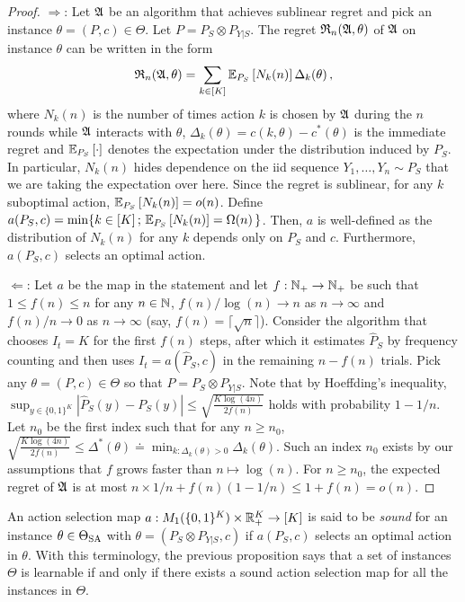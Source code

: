 \begin{proof}
$\Rightarrow$: Let $\mathfrak{A}$ be an algorithm that achieves sublinear regret
and pick  an instance  $\theta = (P,c)\in\Theta$. Let $P = P_S \otimes P_{Y|S}$.
The regret $\mathfrak{R}_n(\mathfrak{A},\theta)$ of $\mathfrak{A}$ on instance $\theta$ can be written in the form
\begin{align*}
\mathfrak{R}_n(\mathfrak{A},\theta) = \sum_{k\in [K]} \mathbb{E}_{P_S}\left[N_k(n)\right] \Delta_k(\theta)\,,
\end{align*}
where $N_k(n)$ is the number of times action $k$ is chosen by $\mathfrak{A}$ during the $n$ rounds while
$\mathfrak{A}$ interacts with $\theta$, $\Delta_k(\theta) = c(k,\theta) - c^*(\theta)$ is the immediate regret
and $\mathbb{E}_{P_S}\left[\cdot\right]$ denotes the expectation under the distribution induced by $P_S$.
In particular, $N_k(n)$ hides dependence on the iid sequence $Y_1,\dots,Y_n \sim P_S$ 
that we are taking the expectation over here. 
Since the regret is sublinear, for any $k$ suboptimal action, $\mathbb{E}_{P_S}\left[N_k(n)\right] = o(n)$. 
Define $a(P_S,c) = \min \{ k\in [K]\,;\, \mathbb{E}_{P_S}\left[N_k(n)\right] = \Omega(n) \,\}$. Then, $a$ is well-defined as the distribution of $N_k(n)$ for any $k$ depends only on $P_S$ and $c$. Furthermore, $a(P_S,c)$ selects an optimal action.

$\Leftarrow$: Let $a$ be the map in the statement and let $f:\mathbb{N}_+\to\mathbb{N}_+$ be such that $1\le f(n)\le n$ for any  $n\in \mathbb{N}$,
$f(n)/\log(n) \to n$ as $n\to \infty$ and $f(n)/n \to 0$ as $n\to \infty$ (say, $f(n) = \lceil \sqrt{n} \rceil$).
Consider the algorithm that chooses $I_t = K$ for the first $f(n)$ steps, after which it estimates $\hat{P}_S$ by
frequency counting and then uses $I_t = a(\hat{P}_S,c)$ in the remaining $n-f(n)$ trials. 
Pick any $\theta = (P,c)\in \Theta$ so that $P = P_S \otimes P_{Y|S}$. 
Note that by Hoeffding's inequality, 
$\sup_{y\in \{0,1\}^K} |\hat{P}_S(y)  - P_S(y)| \le \sqrt{\frac{K\log(4n)}{2f(n)}}$ holds with probability $1-1/n$.
Let $n_0$ be the first index such that for any $n\ge n_0$,
$\sqrt{\frac{K\log(4n)}{2f(n)}}\le \Delta^*(\theta) \doteq \min_{k:\Delta_k(\theta)>0} \Delta_k(\theta)$.
Such an index $n_0$ exists by our assumptions that $f$ grows faster than $n \mapsto \log(n)$.
For $n\ge n_0$, the expected regret of $\mathfrak{A}$ is at most $n \times 1/n + f(n) (1-1/n) \le 1+f(n) = o(n)$.
\end{proof}

An action selection map  $a: M_1( \{0,1\}^K )\times \mathbb{R}_+^K \to [K]$ is said to be \emph{sound} for an instance 
$\theta\in \Theta_{\mathrm{SA}}$ with $\theta = (P_S\otimes P_{Y|S},c)$ if $a(P_S,c)$ selects an optimal action in $\theta$.
With this terminology, the previous proposition says that a set of instances $\Theta$ is learnable if and only if there exists a
sound action selection map for all the instances in $\Theta$.

